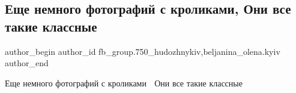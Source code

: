  
 
 
 
 

\subsection{Еще немного фотографий с кроликами, Они все такие классные}
\label{sec:05_04_2018.fb.fb_group.750_hudozhnykiv.1.kroliki_oni_vse_takie_klassnye}
 
\ifcmt
 author_begin
   author_id fb_group.750_hudozhnykiv,beljanina_olena.kyiv
 author_end
\fi

Еще немного фотографий с кроликами 🙂 Они все такие классные

